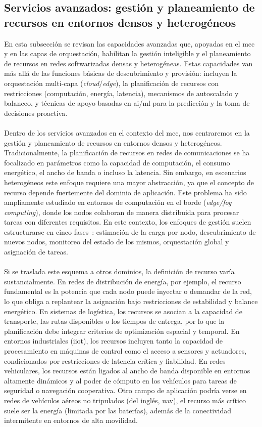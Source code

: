 \subsection{Servicios avanzados: gestión y planeamiento de recursos en entornos densos y heterogéneos}

En esta subsección se revisan las capacidades avanzadas que, apoyadas en el \gls{mcc} y en las capas de orquestación, habilitan la gestión inteligible y el planeamiento de recursos en redes softwarizadas densas y heterogéneas. Estas capacidades van más allá de las funciones básicas de descubrimiento y provisión: incluyen la orquestación multi-capa (\textit{cloud}/\textit{edge}), la planificación de recursos con restricciones (computación, energía, latencia), mecanismos de autoscalado y balanceo, y técnicas de apoyo basadas en \gls{ai}/\gls{ml} para la predicción y la toma de decisiones proactiva. \\
\\
Dentro de los servicios avanzados en el contexto del \gls{mcc}, nos centraremos en la gestión y planeamiento de recursos en entornos densos y heterogéneos. Tradicionalmente, la planificación de recursos en redes de comunicaciones se ha focalizado en parámetros como la capacidad de computación, el consumo energético, el ancho de banda o incluso la latencia. Sin embargo, en escenarios heterogéneos este enfoque requiere una mayor abstracción, ya que el concepto de recurso depende fuertemente del dominio de aplicación. Este problema ha sido ampliamente estudiado en entornos de computación en el borde (\textit{edge/fog computing}), donde los nodos colaboran de manera distribuida para procesar tareas con diferentes requisitos. En este contexto, los enfoques de gestión suelen estructurarse en cinco fases~\cite{Bachiega23}: estimación de la carga por nodo, descubrimiento de nuevos nodos, monitoreo del estado de los mismos, orquestación global y asignación de tareas. \\
\\
Si se traslada este esquema a otros dominios, la definición de recurso varía sustancialmente. En redes de distribución de energía, por ejemplo, el recurso fundamental es la potencia que cada nodo puede inyectar o demandar de la red, lo que obliga a replantear la asignación bajo restricciones de estabilidad y balance energético. En sistemas de logística, los recursos se asocian a la capacidad de transporte, las rutas disponibles o los tiempos de entrega, por lo que la planificación debe integrar criterios de optimización espacial y temporal. En entornos industriales (\gls{iiot}), los recursos incluyen tanto la capacidad de procesamiento en máquinas de control como el acceso a sensores y actuadores, condicionados por restricciones de latencia crítica y fiabilidad. En redes vehiculares, los recursos están ligados al ancho de banda disponible en entornos altamente dinámicos y al poder de cómputo en los vehículos para tareas de seguridad o navegación cooperativa. Otro campo de aplicación podría verse en redes de vehículos aéreos no tripulados (del inglés, \gls{uav}), el recurso más crítico suele ser la energía (limitada por las baterías), además de la conectividad intermitente en entornos de alta movilidad. \\
